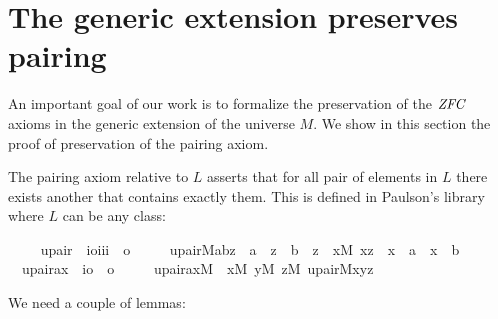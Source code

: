 \section{The generic extension preserves pairing}

An important goal of our work is to formalize the preservation of the $\mathit{ZFC}$ axioms in
the generic extension of the universe $M$. We show in this section the proof of preservation
of the pairing axiom.

The pairing axiom relative to $L$ asserts that for all pair of elements in $L$ there exists another that
contains exactly them. This is defined in Paulson's library where $L$ can be any class:

\begin{isabellebody}
\isanewline
\ \ \isanewline
{}\isamarkupfalse%
\isanewline
\ \ upair\ {\isacharcolon}{\isacharcolon}\ {\isachardoublequoteopen}{\isacharbrackleft}i{\isacharequal}{\isachargreater}o{\isacharcomma}i{\isacharcomma}i{\isacharcomma}i{\isacharbrackright}\ {\isacharequal}{\isachargreater}\ o{\isachardoublequoteclose}\ \isanewline
\ \ \ \ {\isachardoublequoteopen}upair{\isacharparenleft}M{\isacharcomma}a{\isacharcomma}b{\isacharcomma}z{\isacharparenright}\ {\isacharequal}{\isacharequal}\ a\ {\isasymin}\ z\ {\isasymand}\ b\ {\isasymin}\ z\ {\isasymand}\ {\isacharparenleft}{\isasymforall}x{\isacharbrackleft}M{\isacharbrackright}{\isachardot}\ x{\isasymin}z\ {\isasymlongrightarrow}\ x\ {\isacharequal}\ a\ {\isasymor}\ x\ {\isacharequal}\ b{\isacharparenright}{\isachardoublequoteclose}\isanewline
\ \ \isanewline
{}\isamarkupfalse%
\isanewline
\ \ upair{\isacharunderscore}ax\ {\isacharcolon}{\isacharcolon}\ {\isachardoublequoteopen}{\isacharparenleft}i{\isacharequal}{\isachargreater}o{\isacharparenright}\ {\isacharequal}{\isachargreater}\ o{\isachardoublequoteclose}\ \isanewline
\ \ \ \ {\isachardoublequoteopen}upair{\isacharunderscore}ax{\isacharparenleft}M{\isacharparenright}\ {\isacharequal}{\isacharequal}\ {\isasymforall}x{\isacharbrackleft}M{\isacharbrackright}{\isachardot}\ {\isasymforall}y{\isacharbrackleft}M{\isacharbrackright}{\isachardot}\ {\isasymexists}z{\isacharbrackleft}M{\isacharbrackright}{\isachardot}\ upair{\isacharparenleft}M{\isacharcomma}x{\isacharcomma}y{\isacharcomma}z{\isacharparenright}{\isachardoublequoteclose}\isanewline
\end{isabellebody}


We need a couple of lemmas:


